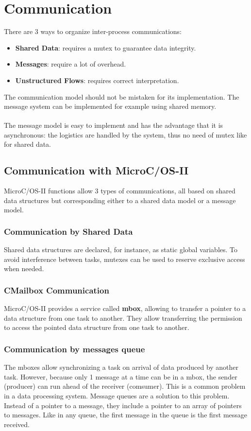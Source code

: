 \documentclass[../main.tex]{subfiles}
\begin{document}
\section{Communication}
There are 3 ways to organize inter-process communications:
\begin{itemize}
	\item \textbf{Shared Data}: requires a mutex to guarantee data integrity.
	\item \textbf{Messages}: require a lot of overhead.
	\item \textbf{Unstructured Flows}: requires correct interpretation.
\end{itemize}
The communication model should not be mistaken for its implementation. The message system can be implemented for example using shared memory.
\\\\
The message model is easy to implement and has the advantage that it is asynchronous: the logistics are handled by the system, thus no need of mutex like for shared data.

\subsection{Communication with MicroC/OS-II}
MicroC/OS-II functions allow 3 types of communications, all based on shared data structures but corresponding either to a shared data model or a message model.

\subsubsection{Communication by Shared Data}
Shared data structures are declared, for instance, as static global variables. To avoid interference between tasks, mutexes can be used to reserve exclusive access when needed.

\subsubsection{CMailbox Communication}
MicroC/OS-II provides a service called \textbf{mbox}, allowing to transfer a pointer to a data structure from one task to another. They allow transferring the permission to access  the pointed data structure from one task to another.


\subsubsection{Communication by messages queue}
The mboxes allow synchronizing a task on arrival of data produced by another task. However, because only 1 message at a time can be in a mbox, the sender (producer) can run ahead of the receiver (comsumer). This is a common problem in a data processing system. 
Message queues are a solution to this problem. Instead of a pointer to a message, they include a pointer to an array of pointers to messages. Like in any queue, the first message in the queue is the first message received.
\end{document}
